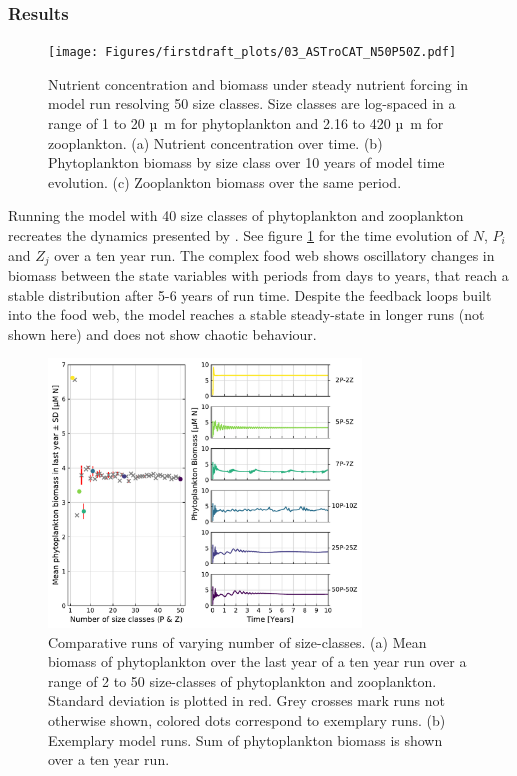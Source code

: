\documentclass[journal abbreviation, manuscript]{copernicus}
\begin{document}
\subsubsection{Results}
\begin{figure}[t]
\texttt{[image: Figures/firstdraft\_plots/03\_ASTroCAT\_N50P50Z.pdf]}
\caption{Nutrient concentration and biomass under steady nutrient forcing in model run resolving 50 size classes. Size classes are log-spaced in a range of 1 to 20 \unit{µ m} for phytoplankton and 2.16 to 420 \unit{µ m} for zooplankton. (a) Nutrient concentration over time. (b) Phytoplankton biomass by size class over 10 years of model time evolution. (c) Zooplankton biomass over the same period.}
\label{Figure:ResultsASTroCAT_1}
\end{figure}

Running the model with 40 size classes of phytoplankton and zooplankton recreates the dynamics presented by \citet{Banas2011b}. See figure \ref{Figure:ResultsASTroCAT_1} for the time evolution of $N$, $P_i$ and $Z_j$ over a ten year run. The complex food web shows oscillatory changes in biomass between the state variables with periods from days to years, that reach a stable distribution after 5-6 years of run time. Despite the feedback loops built into the food web, the model reaches a stable steady-state in longer runs (not shown here) and does not show chaotic behaviour.

\begin{figure}[t]
\includegraphics[width=8.3cm]{Figures/firstdraft_plots/03_ASTroCAT_sizeclassrange.pdf}
\caption{Comparative runs of varying number of size-classes. (a) Mean biomass of phytoplankton over the last year of a ten year run over a range of 2 to 50 size-classes of phytoplankton and zooplankton. Standard deviation is plotted in red. Grey crosses mark runs not otherwise shown, colored dots correspond to exemplary runs. (b) Exemplary model runs. Sum of phytoplankton biomass is shown over a ten year run.}
\label{Figure:ResultsASTroCAT_2}
\end{figure}
\end{document}
